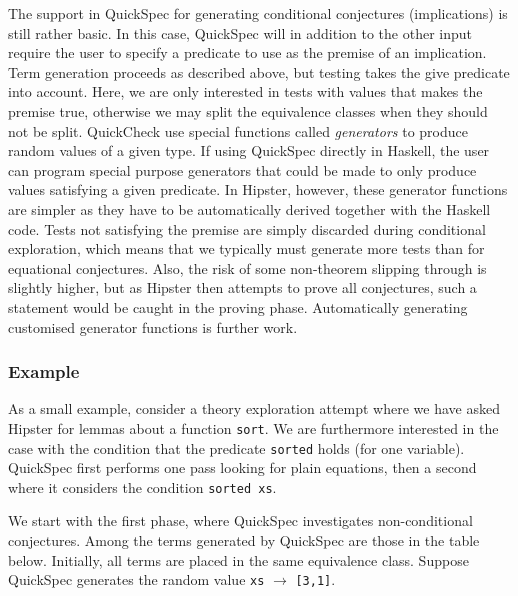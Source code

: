 The support in QuickSpec for generating conditional conjectures (implications) is still rather basic. In this case, QuickSpec will in addition to the other input require the user to specify a predicate to use as the premise of an implication. Term generation proceeds as described above, but testing takes the give predicate into account. Here, we are only interested in tests with values that makes the premise true, otherwise we may split the equivalence classes when they should not be split. QuickCheck use special functions called \emph{generators} to produce random values of a given type. If using QuickSpec directly in Haskell, the user can program special purpose generators that could be made to only produce values satisfying a given predicate. In Hipster, however, these generator functions are simpler as they have to be automatically derived together with the Haskell code. Tests not satisfying the premise are simply discarded during conditional exploration, which means that we typically must generate more tests than for equational conjectures. Also, the risk of some non-theorem slipping through is slightly higher, but as Hipster then attempts to prove all conjectures, such a statement would be caught in the proving phase. Automatically generating customised generator functions is further work. 

\subsubsection*{Example}
As a small example, consider a theory exploration attempt where we have asked Hipster for lemmas about a function \texttt{sort}. We are furthermore interested in the case with the condition that the predicate \texttt{sorted} holds (for one variable). %
QuickSpec first performs one pass looking for plain equations, then a second where it considers the condition \texttt{sorted xs}. 

We start with the first phase, where QuickSpec investigates non-conditional conjectures. Among the terms generated by QuickSpec are those in the table below. Initially, all terms are placed in the same equivalence class. Suppose QuickSpec generates the random value \texttt{xs} $\rightarrow$ \texttt{[3,1]}.     

